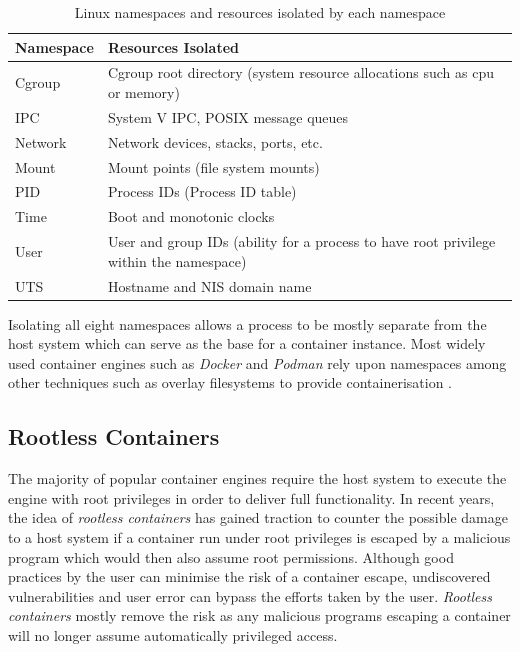 \documentclass[hidelinks]{report}
\begin{document}
\begin{table}[h]
	\centering
	\begin{tabular}{ll}
		\toprule
		\textbf{Namespace} & \textbf{Resources Isolated} \\
		\midrule
		Cgroup & Cgroup root directory (system resource allocations such as cpu or memory) \\
		IPC & System V IPC, POSIX message queues \\
		Network & Network devices, stacks, ports, etc. \\
		Mount  & Mount points (file system mounts) \\
		PID & Process IDs (Process ID table) \\
		Time & Boot and monotonic clocks \\
		User & User and group IDs (ability for a process to have root privilege within the namespace) \\
		UTS & Hostname and NIS domain name \\
		\bottomrule
	\end{tabular}
	\caption{Linux namespaces and resources isolated by each namespace}
	\label{tab:table2}
\end{table}

Isolating all eight namespaces allows a process to be mostly separate from the host system which can serve as the base for a container instance. Most widely used container engines such as \textit{Docker} and \textit{Podman} rely upon namespaces among other techniques such as overlay filesystems to provide containerisation \cite{dockerUnderlying}\cite{podmanUnderlying}.

\subsection{Rootless Containers}
The majority of popular container engines require the host system to execute the engine with root privileges in order to deliver full functionality. In recent years, the idea of \textit{rootless containers} has gained traction to counter the possible damage to a host system if a container run under root privileges is escaped by a malicious program which would then also assume root permissions. Although good practices by the user can minimise the risk of a container escape, undiscovered vulnerabilities and user error can bypass the efforts taken by the user. \textit{Rootless containers} mostly remove the risk as any malicious programs escaping a container will no longer assume automatically privileged access.
\end{document}

